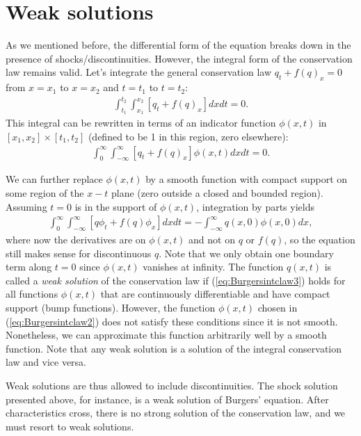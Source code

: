 \documentclass{SIAMbook2016}
\begin{document}
\hypertarget{weak-solutions}{%
\section{Weak solutions}\label{weak-solutions}}

As we mentioned before, the differential form of the equation breaks
down in the presence of shocks/discontinuities. However, the integral
form of the conservation law remains valid. Let's integrate the general
conservation law \(q_t+f(q)_x=0\) from \(x=x_1\) to \(x=x_2\) and
\(t=t_1\) to \(t=t_2\): \begin{align*}
\int_{t_1}^{t_2}\int_{x_1}^{x_2} [q_t+f(q)_x] dx dt = 0.
\end{align*} This integral can be rewritten in terms of an indicator
function \(\phi(x,t)\) in \([x_1,x_2]\times[t_1,t_2]\) (defined to be 1
in this region, zero elsewhere): \begin{align}
\int_{0}^{\infty}\int_{-\infty}^{\infty} [q_t+f(q)_x]\phi(x,t) dx dt = 0.
\label{eq:Burgersintclaw2}
\end{align}

We can further replace \(\phi(x,t)\) by a smooth function with compact
support on some region of the \(x-t\) plane (zero outside a closed and
bounded region). Assuming \(t=0\) is in the support of \(\phi(x,t)\),
integration by parts yields \begin{align}
\int_{0}^{\infty}\int_{-\infty}^{\infty} [q\phi_t+f(q)\phi_x] dx dt = -\int_{-\infty}^{\infty}q(x,0)\phi(x,0)dx,
\label{eq:Burgersintclaw3}
\end{align} where now the derivatives are on \(\phi(x,t)\) and not on
\(q\) or \(f(q)\), so the equation still makes sense for discontinuous
\(q\). Note that we only obtain one boundary term along \(t=0\) since
\(\phi(x,t)\) vanishes at infinity. The function \(q(x,t)\) is called a
\emph{weak solution} of the conservation law if
(\ref{eq:Burgersintclaw3}) holds for all functions \(\phi(x,t)\) that
are continuously differentiable and have compact support (bump
functions). However, the function \(\phi(x,t)\) chosen in
(\ref{eq:Burgersintclaw2}) does not satisfy these conditions since it is
not smooth. Nonetheless, we can approximate this function arbitrarily
well by a smooth function. Note that any weak solution is a solution of
the integral conservation law and vice versa.

Weak solutions are thus allowed to include discontinuities. The shock
solution presented above, for instance, is a weak solution of Burgers'
equation. After characteristics cross, there is no strong solution of
the conservation law, and we must resort to weak solutions.
\end{document}
